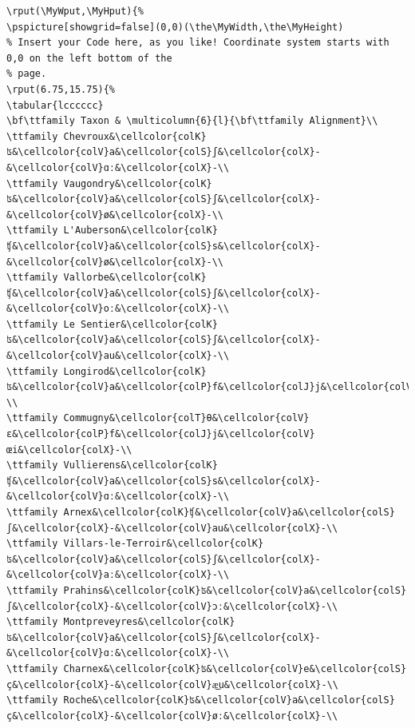 \begin{verbatim}
\rput(\MyWput,\MyHput){%
\pspicture[showgrid=false](0,0)(\the\MyWidth,\the\MyHeight)
% Insert your Code here, as you like! Coordinate system starts with 0,0 on the left bottom of the
% page. 
\rput(6.75,15.75){%
\tabular{lcccccc}
\bf\ttfamily Taxon & \multicolumn{6}{l}{\bf\ttfamily Alignment}\\
\ttfamily Chevroux&\cellcolor{colK}ʦ&\cellcolor{colV}a&\cellcolor{colS}ʃ&\cellcolor{colX}-&\cellcolor{colV}ɑː&\cellcolor{colX}-\\
\ttfamily Vaugondry&\cellcolor{colK}ʦ&\cellcolor{colV}a&\cellcolor{colS}ʃ&\cellcolor{colX}-&\cellcolor{colV}ø&\cellcolor{colX}-\\
\ttfamily L'Auberson&\cellcolor{colK}ʧ&\cellcolor{colV}a&\cellcolor{colS}s&\cellcolor{colX}-&\cellcolor{colV}ø&\cellcolor{colX}-\\
\ttfamily Vallorbe&\cellcolor{colK}ʧ&\cellcolor{colV}a&\cellcolor{colS}ʃ&\cellcolor{colX}-&\cellcolor{colV}oː&\cellcolor{colX}-\\
\ttfamily Le Sentier&\cellcolor{colK}ʦ&\cellcolor{colV}a&\cellcolor{colS}ʃ&\cellcolor{colX}-&\cellcolor{colV}au&\cellcolor{colX}-\\
\ttfamily Longirod&\cellcolor{colK}ʦ&\cellcolor{colV}a&\cellcolor{colP}f&\cellcolor{colJ}j&\cellcolor{colV}aː&\cellcolor{colX}-\\
\ttfamily Commugny&\cellcolor{colT}θ&\cellcolor{colV}ɛ&\cellcolor{colP}f&\cellcolor{colJ}j&\cellcolor{colV}œi&\cellcolor{colX}-\\
\ttfamily Vullierens&\cellcolor{colK}ʧ&\cellcolor{colV}a&\cellcolor{colS}s&\cellcolor{colX}-&\cellcolor{colV}ɑː&\cellcolor{colX}-\\
\ttfamily Arnex&\cellcolor{colK}ʧ&\cellcolor{colV}a&\cellcolor{colS}ʃ&\cellcolor{colX}-&\cellcolor{colV}au&\cellcolor{colX}-\\
\ttfamily Villars-le-Terroir&\cellcolor{colK}ʦ&\cellcolor{colV}a&\cellcolor{colS}ʃ&\cellcolor{colX}-&\cellcolor{colV}aː&\cellcolor{colX}-\\
\ttfamily Prahins&\cellcolor{colK}ʦ&\cellcolor{colV}a&\cellcolor{colS}ʃ&\cellcolor{colX}-&\cellcolor{colV}ɔː&\cellcolor{colX}-\\
\ttfamily Montpreveyres&\cellcolor{colK}ʦ&\cellcolor{colV}a&\cellcolor{colS}ʃ&\cellcolor{colX}-&\cellcolor{colV}ɑː&\cellcolor{colX}-\\
\ttfamily Charnex&\cellcolor{colK}ʦ&\cellcolor{colV}e&\cellcolor{colS}ç&\cellcolor{colX}-&\cellcolor{colV}æ͜u&\cellcolor{colX}-\\
\ttfamily Roche&\cellcolor{colK}ʦ&\cellcolor{colV}a&\cellcolor{colS}ç&\cellcolor{colX}-&\cellcolor{colV}øː&\cellcolor{colX}-\\

\end{verbatim}
